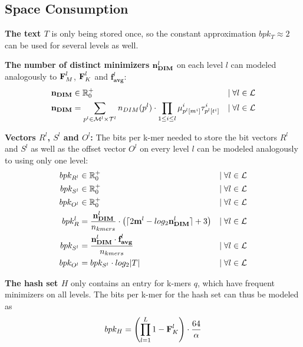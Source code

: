 \documentclass[a4paper,titlepage,onecolumn,oneside,12pt,nenglish,titlepage=firstiscover]{scrbook}
\theoremstyle{plain} %
\theoremstyle{definition} %
\theoremstyle{remark} %
\theoremstyle{plain}
\newcommand{\RR}{\mathbb{R}} %
\newcommand{\minimizerLength}{m}
\newcommand{\threshold}{t}
\newcommand{\level}{l}
\newcommand{\kmer}{q}
\newcommand{\varAverageFrequency}{\textbf{f}_{\textbf{avg}}}
\newcommand{\possibleMinimizerLengths}{\mathcal{M}}
\newcommand{\possibleThresholds}{\mathcal{T}}
\newcommand{\indicatorm}{\mu}
\newcommand{\indicatort}{\tau}
\newcommand{\varMinimizerLength}{\textbf{\minimizerLength}}
\begin{document}
\subsection{Space Consumption}
\textbf{The text $T$} is only being stored once, so the constant approximation $bpk_T \approx 2$ can be used for several levels as well.

\textbf{The number of distinct \infrequent minimizers} $\varNumberOfDistinctMinimizers^\level$ on each level $\level$ can modeled analogously to $\varCDF{M}^\level$, $\varCDF{K}^\level$ and $\varAverageFrequency^\level$:
\begin{align*}
	\varNumberOfDistinctMinimizers &\in \RR^+_0 &\mid \forall l \in \setOfLevels
	\\
	\varNumberOfDistinctMinimizers &= \sum\limits_{\levelParameters{\level} \in \possibleMinimizerLengths^\level \times \possibleThresholds^\level}
	\numberOfDistinctMinimizers{\levelParameters{\level}} 
	\cdot
	\prod_{1\leq i \leq \level} \indicatorm^i_{\parameterAccess{\level}{\minimizerLength}{i}} \indicatort^i_{\parameterAccess{\level}{\threshold}{i}}
	& \mid \forall l \in \setOfLevels
\end{align*}

\textbf{Vectors $R^\level$, $S^\level$ and $O^\level$:} The bits per k-mer needed to store the bit vectors $R^\level$ and $S^\level$ as well as the offset vector $O^\level$ on every level $\level$ can be modeled analogously to using only one level:
\begin{align*}
	bpk_{R^\level} & \in \RR^+_0 &\mid \forall l \in \setOfLevels
	\\
	bpk_{S^\level} & \in \RR^+_0 &\mid \forall l \in \setOfLevels
	\\
	bpk_{O^\level} & \in \RR^+_0 &\mid \forall l \in \setOfLevels
	\\
	bpk_{R}^\level &= \frac{\varNumberOfDistinctMinimizers^\level}{\nkmers} \cdot \left(\lceil 2\varMinimizerLength^\level - log_2\varNumberOfDistinctMinimizers^\level \rceil + 3 \right) &\mid \forall l \in \setOfLevels
	\\
	bpk_{S^\level} &= \frac{\varNumberOfDistinctMinimizers^\level \cdot \varAverageFrequency^\level}{\nkmers} &\mid \forall l \in \setOfLevels
	\\
	bpk_{O^\level} &= bpk_{S^\level} \cdot log_2 |T| &\mid \forall l \in \setOfLevels
\end{align*}

\textbf{The hash set $H$} only contains an entry for k-mers $\kmer$, which have frequent minimizers on all levels.
The bits per k-mer for the hash set can thus be modeled as 
\[ bpk_H = \left(\prod_{l=1}^{L} 1-\varCDF{K}^\level\right) \cdot \frac{64}{\alpha}\]
\end{document}
